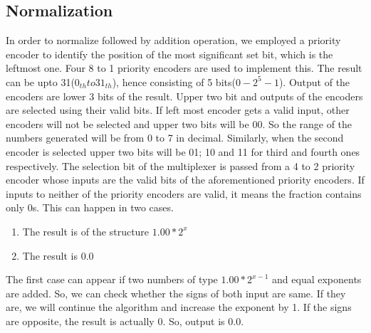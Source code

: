 \documentclass[12pt]{article}
\begin{document}
\subsection{Normalization}
In order to normalize followed by addition operation, we employed a priority encoder to identify the position of the most significant set bit, which is the leftmost one. Four 8 to 1 priority encoders are used to implement this. 
The result can be upto 31($0_{th} to 31_{th}$), hence consisting of 5 bits($0-2^{5}-1$). Output of the encoders are lower 3 bits of the result. Upper two bit and outputs of the encoders are selected using their valid bits. If left most encoder gets a valid input, other encoders will not be selected and upper two bits will be 00. So the range of the numbers generated will be from 0 to 7 in decimal. Similarly, when the second encoder is selected upper two bits will be 01; 10 and 11 for third and fourth ones respectively. The selection bit of the multiplexer is passed from a 4 to 2 priority encoder whose inputs are the valid bits of the aforementioned priority encoders. If inputs to neither of the priority encoders are valid, it means the fraction contains only 0s. This can happen in two cases.
\begin{enumerate}
    \item The result is of the structure $1.00 * 2^{x}$
    \item The result is $0.0$
\end{enumerate}
The first case can appear if two numbers of type $1.00 * 2^{x-1}$ and equal exponents are added. So, we can check whether the signs of both input are same. If they are, we will continue the algorithm and increase the exponent by 1. If the signs are opposite, the result is actually 0. So, output is 0.0.
\end{document}
